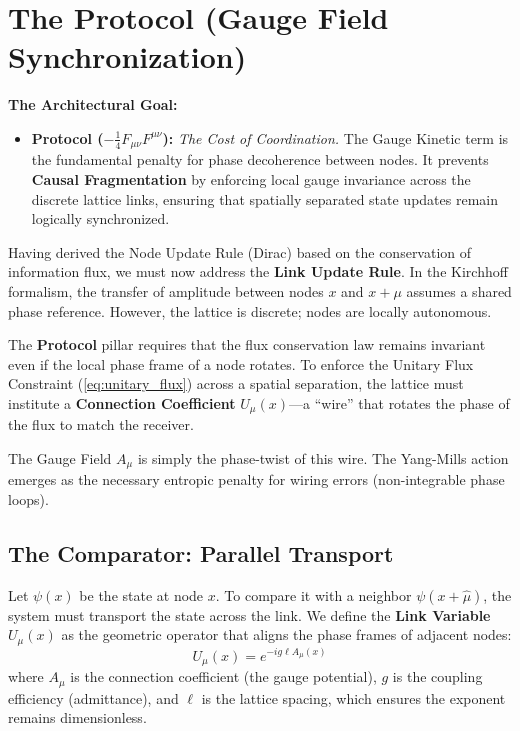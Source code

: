 \section{The Protocol (Gauge Field Synchronization)}
\label{sec:protocol}

\textbf{The Architectural Goal:} 
\begin{itemize}
    \item \textbf{Protocol ($-\frac{1}{4}F_{\mu\nu}F^{\mu\nu}$):} \textit{The Cost of Coordination.} The Gauge Kinetic term is the fundamental penalty for phase decoherence between nodes. It prevents \textbf{Causal Fragmentation} by enforcing local gauge invariance across the discrete lattice links, ensuring that spatially separated state updates remain logically synchronized.
\end{itemize}

Having derived the Node Update Rule (Dirac) based on the conservation of information flux, we must now address the \textbf{Link Update Rule}. In the Kirchhoff formalism, the transfer of amplitude between nodes $x$ and $x+\mu$ assumes a shared phase reference. However, the lattice is discrete; nodes are locally autonomous.

The \textbf{Protocol} pillar requires that the flux conservation law remains invariant even if the local phase frame of a node rotates. To enforce the Unitary Flux Constraint (\cref{eq:unitary_flux}) across a spatial separation, the lattice must institute a \textbf{Connection Coefficient} $U_\mu(x)$---a ``wire'' that rotates the phase of the flux to match the receiver.

The Gauge Field $A_\mu$ is simply the phase-twist of this wire. The Yang-Mills action emerges as the necessary entropic penalty for wiring errors (non-integrable phase loops).

\subsection{The Comparator: Parallel Transport}
Let $\psi(x)$ be the state at node $x$. To compare it with a neighbor $\psi(x+\hat{\mu})$, the system must transport the state across the link. We define the \textbf{Link Variable} $U_\mu(x)$ as the geometric operator that aligns the phase frames of adjacent nodes:
\begin{equation}
    U_\mu(x) = e^{-ig \ell A_\mu(x)}
\end{equation}
where $A_\mu$ is the connection coefficient (the gauge potential), $g$ is the coupling efficiency (admittance), and $\ell$ is the lattice spacing, which ensures the exponent remains dimensionless.

